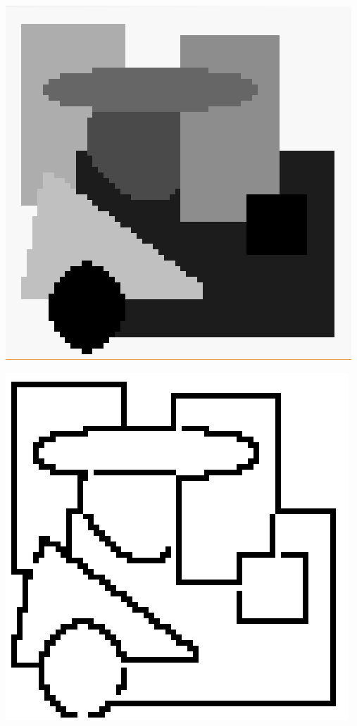 \begin{multicols}{2}
\begin{minipage}{0.5\linewidth}
	\centering
	\includegraphics[width=0.9\linewidth]{./Experiments/Template/fig/1.png} 
\end{minipage}
\begin{minipage}{0.5\linewidth}
	\centering
	\includegraphics[width=0.9\linewidth]{./Experiments/Template/fig/2.png}
\end{minipage}


\end{multicols}
